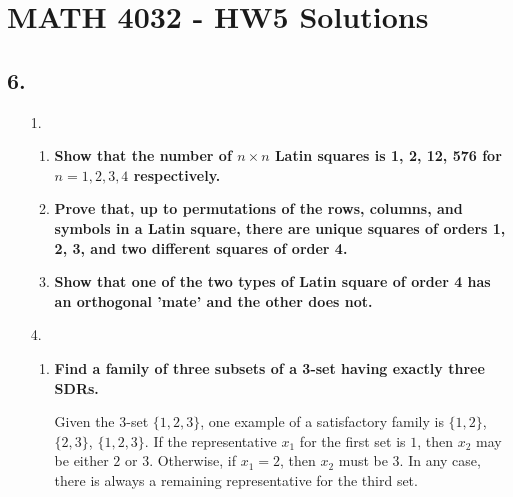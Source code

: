 \documentclass[a4paper,12pt]{article}
\begin{document}
\section*{MATH 4032 - HW5 Solutions}
\subsection*{6.}
\begin{enumerate}
    \item[1.]
        \begin{enumerate}
            \item
                \boldmath
                \textbf{Show that the number of $n \times n$ Latin squares is 1, 2, 12, 576 for $n = 1, 2, 3, 4$ respectively.} \par
                \unboldmath

            \item
                \boldmath
                \textbf{Prove that, up to permutations of the rows, columns, and symbols in a Latin square, there are unique squares of orders 1, 2, 3, and two different squares of order 4.} \par
                \unboldmath

            \item
                \boldmath
                \textbf{Show that one of the two types of Latin square of order 4 has an orthogonal 'mate' and the other does not.} \par
                \unboldmath
        \end{enumerate}

    \item[4.]
        \begin{enumerate}
            \item
                \boldmath
                \textbf{Find a family of three subsets of a 3-set having exactly three SDRs.} \par
                \unboldmath
                Given the 3-set $\{ 1, 2, 3 \}$, one example of a satisfactory family is $\{ 1, 2 \}$, $\{ 2, 3 \}$, $\{ 1, 2, 3 \}$. If the representative $x_1$ for the first set is $1$, then $x_2$ may be either $2$ or $3$. Otherwise, if $x_1 = 2$, then $x_2$ must be $3$. In any case, there is always a remaining representative for the third set.


\end{enumerate}
\end{enumerate}
\end{document}
